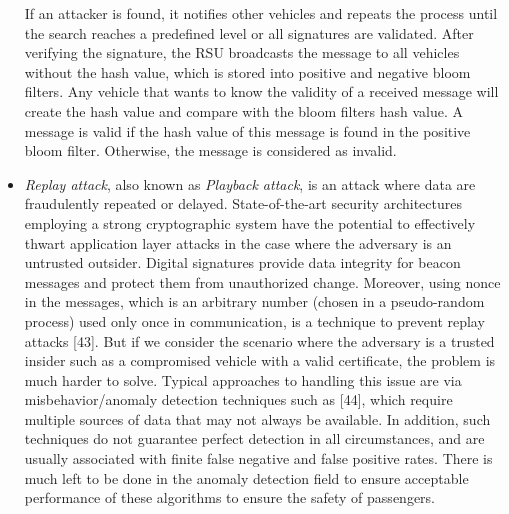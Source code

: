 \begin{itemize}
        \newline
        If an attacker is found, it notifies other vehicles and repeats the process until the search reaches a predefined level or all signatures are validated. After verifying the signature, the RSU broadcasts the message to all vehicles without the hash value, which is stored into positive and negative bloom filters. Any vehicle that wants to know the validity of a received message will create the hash value and compare with the bloom filters hash value. A message is valid if the hash value of this message is found in the positive bloom filter. Otherwise, the message is considered as invalid.
        
        \item \textit{Replay attack}, also known as \textit{Playback attack}, is an attack where data are fraudulently repeated or delayed. State-of-the-art security architectures employing a strong cryptographic system have the potential to effectively thwart application layer attacks in the case where the adversary is an untrusted outsider. Digital signatures provide data integrity for beacon messages and protect them from unauthorized change. Moreover, using nonce in the messages, which is an arbitrary number (chosen in a pseudo-random process) used only once in communication, is a technique to prevent replay attacks [43].
        \newline
        But if we consider the scenario where the adversary is a trusted insider such as a compromised vehicle with a valid certificate, the problem is much harder to solve. Typical approaches to handling this issue are via misbehavior/anomaly detection techniques such as [44], which require multiple sources of data that may not always be available. In addition, such techniques do not guarantee perfect detection in all circumstances, and are usually associated with finite false negative and false positive rates. There is much left to be done in the anomaly detection field to ensure acceptable performance of these algorithms to ensure the safety of passengers.
    \end{itemize}
    
